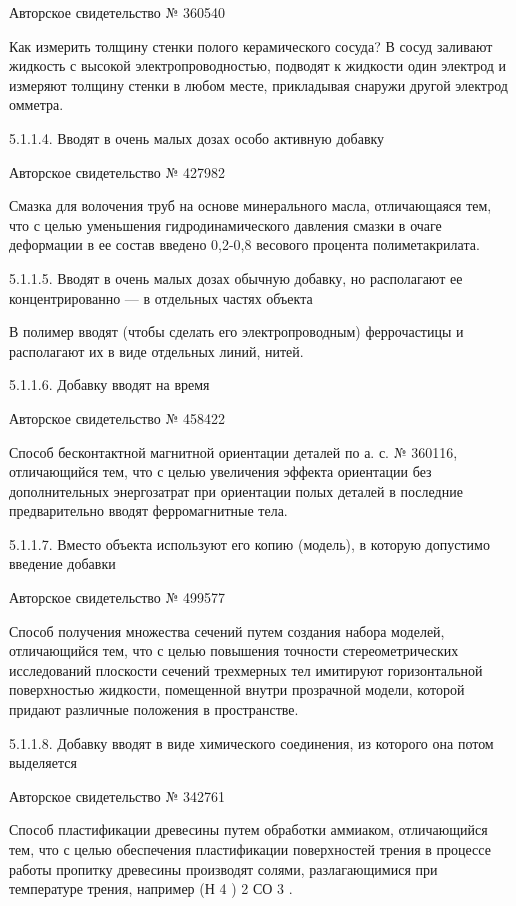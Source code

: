 Авторское свидетельство № 360540

Как  измерить  толщину стенки  полого  керамического  сосуда? В  сосуд
заливают жидкость  с высокой электропроводностью, подводят  к жидкости
один электрод  и измеряют  толщину стенки  в любом  месте, прикладывая
снаружи другой электрод омметра.

5.1.1.4. Вводят в очень малых дозах особо активную добавку

Авторское свидетельство № 427982

Смазка для  волочения труб на основе  минерального масла, отличающаяся
тем,  что  с целью  уменьшения  гидродинамического  давления смазки  в
очаге  деформации  в  ее  состав  введено  0,2-0,8  весового  процента
полиметакрилата.


5.1.1.5. Вводят в очень малых дозах обычную добавку, но располагают ее
концентрированно — в отдельных частях объекта

В полимер  вводят (чтобы сделать его  электропроводным) феррочастицы и
располагают их в виде отдельных линий, нитей.


5.1.1.6. Добавку вводят на время

Авторское свидетельство № 458422

Способ бесконтактной магнитной  ориентации деталей по а.  с. № 360116,
отличающийся  тем,  что  с  целью увеличения  эффекта  ориентации  без
дополнительных энергозатрат  при ориентации полых деталей  в последние
предварительно вводят ферромагнитные тела.


5.1.1.7.  Вместо  объекта используют  его  копию  (модель), в  которую
допустимо введение добавки

Авторское свидетельство № 499577

Способ  получения множества  сечений  путем  создания набора  моделей,
отличающийся  тем, что  с целью  повышения точности  стереометрических
исследований плоскости сечений трехмерных тел имитируют горизонтальной
поверхностью  жидкости, помещенной  внутри прозрачной  модели, которой
придают различные положения в пространстве.

5.1.1.8. Добавку вводят в виде химического соединения, из которого она
потом выделяется

Авторское свидетельство № 342761

Способ пластификации древесины  путем обработки аммиаком, отличающийся
тем,  что  с целью  обеспечения  пластификации  поверхностей трения  в
процессе работы  пропитку древесины производят  солями, разлагающимися
при температуре трения, например (Н 4 ) 2 СО 3 .

